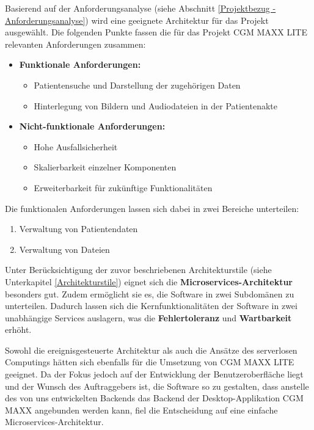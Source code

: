     Basierend auf der Anforderungsanalyse (siehe Abschnitt \ref{Projektbezug - Anforderungsanalyse}) wird eine geeignete Architektur für das Projekt ausgewählt. Die folgenden Punkte fassen die für das Projekt CGM MAXX LITE relevanten Anforderungen zusammen:
    \begin{itemize}
        \item \textbf{Funktionale Anforderungen:}
        \begin{itemize}[label=$\circ$]
            \item Patientensuche und Darstellung der zugehörigen Daten
            \item Hinterlegung von Bildern und Audiodateien in der Patientenakte
        \end{itemize}
        
        \item \textbf{Nicht-funktionale Anforderungen:}
        \begin{itemize}[label=$\circ$]
            \item Hohe Ausfallsicherheit
            \item Skalierbarkeit einzelner Komponenten
            \item Erweiterbarkeit für zukünftige Funktionalitäten
        \end{itemize}
    \end{itemize}

    Die funktionalen Anforderungen lassen sich dabei in zwei Bereiche unterteilen:
    \begin{enumerate}
        \item Verwaltung von Patientendaten
        \item Verwaltung von Dateien
    \end{enumerate}

    Unter Berücksichtigung der zuvor beschriebenen Architekturstile (siehe Unterkapitel \ref{Architekturstile}) eignet sich die \textbf{Microservices-Architektur} besonders gut. Zudem ermöglicht sie es, die Software in zwei Subdomänen zu unterteilen. Dadurch lassen sich die Kernfunktionalitäten der Software in zwei unabhängige Services auslagern, was die \textbf{Fehlertoleranz} und \textbf{Wartbarkeit} erhöht.

    Sowohl die ereignisgesteuerte Architektur als auch die Ansätze des serverlosen Computings hätten sich ebenfalls für die Umsetzung von CGM MAXX LITE geeignet. Da der Fokus jedoch auf der Entwicklung der Benutzeroberfläche liegt und der Wunsch des Auftraggebers ist, die Software so zu gestalten, dass anstelle des von uns entwickelten Backends das Backend der Desktop-Applikation CGM MAXX angebunden werden kann, fiel die Entscheidung auf eine einfache Microservices-Architektur.

